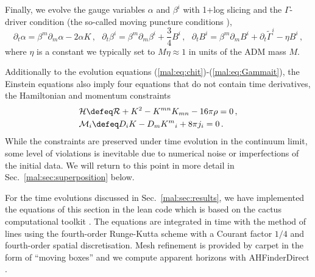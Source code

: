 Finally, we evolve the gauge variables $\alpha$ and $\beta^i$
with 1+log slicing and the $\Gamma$-driver condition
(the so-called moving puncture conditions
\cite{Campanelli:2005dd,Baker:2005vv}),
%
\begin{equation}
  \partial_t \alpha = \beta^m \partial_m \alpha
  -2\alpha K
  \,,~~~
  \partial_t \beta^i = \beta^m\partial_m \beta^i
  +\frac{3}{4}B^i
  \,,~~~
  \partial_t B^i = \beta^m \partial_m B^i
  +\partial_t \tilde{\Gamma}^i
  -\eta B^i\,,
\end{equation}
%
where $\eta$ is a constant we typically set to $M\eta\approx 1$
in units of the ADM mass $M$.

Additionally to the evolution equations (\ref{mal:eq:chit})-(\ref{mal:eq:Gammait}),
the Einstein equations also imply four equations that do not contain time
derivatives, the Hamiltonian and momentum constraints
%
\begin{align}
  &\mathcal{H} \defeq \mathcal{R}+K^2-K^{mn}K_{mn} - 16\pi \rho = 0\,,
  \label{mal:eq:ham} \\
  &\mathcal{M}_i\defeq D_i K - D_m K^m{}_i + 8\pi j_i = 0\,.
  \label{mal:eq:mom}
\end{align}
%
While the constraints are preserved under time evolution in the continuum limit,
some level of violations is inevitable due to numerical noise or imperfections
of the initial data. We will return to this point in more detail in
Sec.~\ref{mal:sec:superposition} below.

For the time evolutions discussed in Sec.~\ref{mal:sec:results},
we have implemented the equations of this section in the
{\sc lean} code \cite{Sperhake:2006cy} which is based on the
{\sc cactus} computational toolkit \cite{Allen:1999}. The
equations are integrated in time with the method of lines
using the fourth-order Runge-Kutta scheme with a
Courant factor $1/4$ and fourth-order
spatial discretisation. Mesh refinement is provided by
{\sc carpet} \cite{Schnetter:2003rb} in the form of ``moving
boxes'' and we compute apparent horizons with
{\sc AHFinderDirect} \cite{Thornburg:1995cp,Thornburg:2003sf}.

